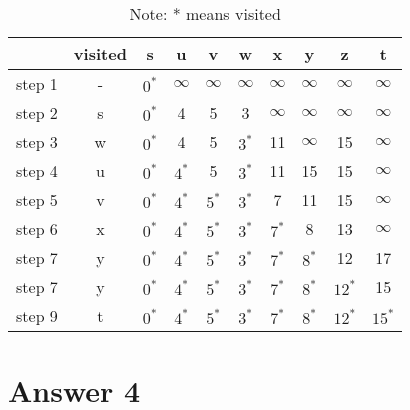 \documentclass[12pt]{article}
\begin{document}
\begin{table}[H]
        \centering
        \begin{tabular}{|c|c|c|c|c|c|c|c|c|c|}
		\hline
                 & visited & s & u & v & w & x & y & z & t \\
             \hline
             step 1  & - & $0^{*}$ & $\infty$ & $\infty$ & $\infty$ & $\infty$ & $\infty$ & $\infty$ & $\infty$\\
             step 2  & s & $0^{*}$ &      4    &      5    &      3     & $\infty$ & $\infty$ & $\infty$ & $\infty$\\
             step 3  & w & $0^{*}$ &      4    &      5    & $3^{*}$ &     11    & $\infty$ &      15   & $\infty$\\
             step 4  & u & $0^{*}$ & $4^{*}$ &      5    & $3^{*}$ &   11    &     15    &     15    & $\infty$\\
             step 5  & v & $0^{*}$ & $4^{*}$ & $5^{*}$& $3^{*}$ &   7      & 11       & 15        & $\infty$\\
             step 6  & x & $0^{*}$ & $4^{*}$ & $5^{*}$ &  $3^{*}$ & $7^{*}$ & 8    &   13    & $\infty$\\
             step 7  & y & $0^{*}$ & $4^{*}$ & $5^{*}$ &  $3^{*}$ & $7^{*}$ & $8^{*}$ &  12  &   17\\
             step 7  & y & $0^{*}$ & $4^{*}$ & $5^{*}$ &  $3^{*}$ & $7^{*}$ & $8^{*}$ &  $12^{*}$ &15\\
		step 9  & t & $0^{*}$ & $4^{*}$ &  $5^{*}$  & $3^{*}$ & $7^{*}$ & $8^{*}$  & $12^{*}$ & $15^{*}$\\
		\hline
               
        \end{tabular}
        
	\caption{Note: * means visited}
	

    \end{table}{}



\section*{Answer 4}
\end{document}
